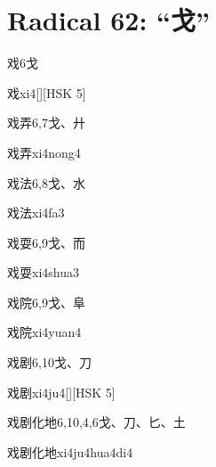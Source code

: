 
\section*{Radical 62: ``⼽''}

\begin{entry}{戏}{6}{⼽}
  \begin{phonetics}{戏}{xi4}[][HSK 5]
  \end{phonetics}
\end{entry}

\begin{entry}{戏弄}{6,7}{⼽、⼶}
  \begin{phonetics}{戏弄}{xi4nong4}
  \end{phonetics}
\end{entry}

\begin{entry}{戏法}{6,8}{⼽、⽔}
  \begin{phonetics}{戏法}{xi4fa3}
  \end{phonetics}
\end{entry}

\begin{entry}{戏耍}{6,9}{⼽、⽽}
  \begin{phonetics}{戏耍}{xi4shua3}
  \end{phonetics}
\end{entry}

\begin{entry}{戏院}{6,9}{⼽、⾩}
  \begin{phonetics}{戏院}{xi4yuan4}
  \end{phonetics}
\end{entry}

\begin{entry}{戏剧}{6,10}{⼽、⼑}
  \begin{phonetics}{戏剧}{xi4ju4}[][HSK 5]
  \end{phonetics}
\end{entry}

\begin{entry}{戏剧化地}{6,10,4,6}{⼽、⼑、⼔、⼟}
  \begin{phonetics}{戏剧化地}{xi4ju4hua4di4}
  \end{phonetics}
\end{entry}

